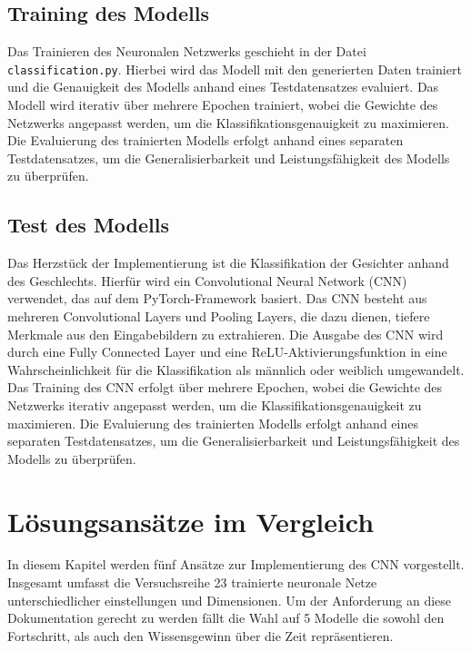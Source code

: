 \documentclass[journal,twoside,web]{ieeecolor}
\begin{document}
\subsection{Training des Modells}
Das Trainieren des Neuronalen Netzwerks geschieht in der Datei \texttt{classification.py}. Hierbei wird das Modell mit den generierten Daten trainiert und die Genauigkeit des Modells anhand eines Testdatensatzes evaluiert. Das Modell wird iterativ über mehrere Epochen trainiert, wobei die Gewichte des Netzwerks angepasst werden, um die Klassifikationsgenauigkeit zu maximieren. Die Evaluierung des trainierten Modells erfolgt anhand eines separaten Testdatensatzes, um die Generalisierbarkeit und Leistungsfähigkeit des Modells zu überprüfen.

\subsection{Test des Modells}
Das Herzstück der Implementierung ist die Klassifikation der Gesichter anhand des Geschlechts. Hierfür wird ein Convolutional Neural Network (CNN) verwendet, das auf dem PyTorch-Framework basiert. Das CNN besteht aus mehreren Convolutional Layers und Pooling Layers, die dazu dienen, tiefere Merkmale aus den Eingabebildern zu extrahieren. Die Ausgabe des CNN wird durch eine Fully Connected Layer und eine ReLU-Aktivierungsfunktion in eine Wahrscheinlichkeit für die Klassifikation als männlich oder weiblich umgewandelt. Das Training des CNN erfolgt über mehrere Epochen, wobei die Gewichte des Netzwerks iterativ angepasst werden, um die Klassifikationsgenauigkeit zu maximieren. Die Evaluierung des trainierten Modells erfolgt anhand eines separaten Testdatensatzes, um die Generalisierbarkeit und Leistungsfähigkeit des Modells zu überprüfen.



\section{Lösungsansätze im Vergleich}
In diesem Kapitel werden fünf Ansätze zur Implementierung des CNN vorgestellt. Insgesamt umfasst die Versuchsreihe 23 trainierte neuronale Netze unterschiedlicher einstellungen und Dimensionen.
Um der Anforderung an diese Dokumentation gerecht zu werden fällt die Wahl auf 5 Modelle die sowohl den Fortschritt, als auch den Wissensgewinn über die Zeit repräsentieren.
\end{document}
